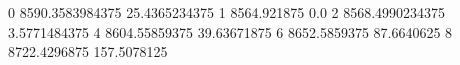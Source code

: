0 8590.3583984375 25.4365234375
1 8564.921875 0.0
2 8568.4990234375 3.5771484375
4 8604.55859375 39.63671875
6 8652.5859375 87.6640625
8 8722.4296875 157.5078125
